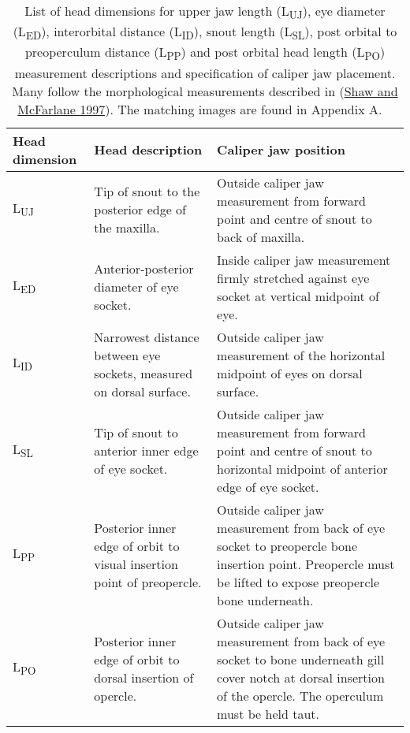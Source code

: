 \documentclass[12pt]{article}\usepackage[]{graphicx}\usepackage[]{color}
\begin{document}
\begin{table}[!h]

\caption{\label{tab:table1}List of head dimensions for upper jaw length (L\textsubscript{UJ}), eye diameter (L\textsubscript{ED}), interorbital distance (L\textsubscript{ID}), snout length (L\textsubscript{SL}), post orbital to preoperculum distance (L\textsubscript{PP}) and post orbital head length (L\textsubscript{PO}) measurement descriptions and specification of caliper jaw placement. Many follow the morphological measurements described in (\protect\hyperlink{ref-Shaw1997}{Shaw and McFarlane 1997}). The matching images are found in Appendix A. ~\\
\hspace*{0.333em}\hspace*{0.333em}}
\fontsize{10}{12}\selectfont
\begin{tabular}[t]{>{\raggedright\arraybackslash}p{1.9cm}>{\raggedright\arraybackslash}p{6.0cm}>{\raggedright\arraybackslash}p{7.5cm}}
\toprule
\textbf{Head dimension} & \textbf{Head description} & \textbf{Caliper jaw position}\\
\midrule
L\textsubscript{UJ} & Tip of snout to the posterior edge of the maxilla. & Outside caliper jaw measurement from forward point and centre of snout to back of maxilla.\\
\midrule
L\textsubscript{ED} & Anterior-posterior diameter of eye socket. & Inside caliper jaw measurement firmly stretched against eye socket at vertical midpoint of eye.\\
\midrule
L\textsubscript{ID} & Narrowest distance between eye sockets, measured on dorsal surface. & Outside caliper jaw measurement of the horizontal midpoint of eyes on dorsal surface.\\
\midrule
L\textsubscript{SL} & Tip of snout to anterior inner edge of eye socket. & Outside caliper jaw measurement from forward point and centre of snout to horizontal midpoint of anterior edge of eye socket.\\
\midrule
L\textsubscript{PP} & Posterior inner edge of orbit to visual insertion point of preopercle. & Outside caliper jaw measurement from back of eye socket to preopercle bone insertion point. Preopercle must be lifted to expose preopercle bone underneath.\\
\midrule
L\textsubscript{PO} & Posterior inner edge of orbit to dorsal insertion of opercle. & Outside caliper jaw measurement from back of eye socket to bone underneath gill cover notch at dorsal insertion of the opercle.  The operculum must be held taut.\\
\bottomrule
\end{tabular}
\end{table}
~\\
\hspace*{0.333em}\\
\hspace*{0.333em}\\
\end{document}
